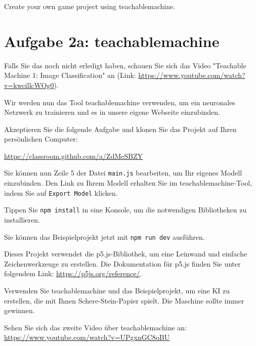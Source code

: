 \documentclass[12pt,a4paper]{report}
\begin{document}
\begin{ex}
     Create your own game project using teachablemachine.
\end{ex}

\newpage

\section*{Aufgabe 2a: teachablemachine}

\begin{ex}
    Falls Sie das noch nicht erledigt haben, schauen Sie sich das Video "Teachable Machine 1: Image Classification" an (Link: \url{https://www.youtube.com/watch?v=kwcillcWOg0}).
\end{ex}

Wir werden nun das Tool teachablemachine verwenden, um ein neuronales Netzwerk zu trainieren und es in unsere eigene Webseite einzubinden.

\begin{ex}
    Akzeptieren Sie die folgende Aufgabe und klonen Sie das Projekt auf Ihren persönlichen Computer:
    
    \url{https://classroom.github.com/a/ZdMeSBZY}

    Sie können nun Zeile 5 der Datei \verb|main.js| bearbeiten, um Ihr eigenes Modell einzubinden. Den Link zu Ihrem Modell erhalten Sie im teachablemachine-Tool, indem Sie auf \verb|Export Model| klicken.

    Tippen Sie \verb|npm install| in eine Konsole, um die notwendigen Bibliotheken zu installieren.

    Sie können das Beispielprojekt jetzt mit \verb|npm run dev| ausführen.

    Dieses Projekt verwendet die p5.js-Bibliothek, um eine Leinwand und einfache Zeichenwerkzeuge zu erstellen. Die Dokumentation für p5.js finden Sie unter folgendem Link: \url{https://p5js.org/reference/}.
\end{ex}

\begin{ex}
    Verwenden Sie teachablemachine und das Beispielprojekt, um eine KI zu erstellen, die mit Ihnen Schere-Stein-Papier spielt. Die Maschine sollte immer gewinnen.
\end{ex}

\begin{ex}
    Sehen Sie sich das zweite Video über teachablemachine an: \url{https://www.youtube.com/watch?v=UPgxnGC8oBU}
\end{ex}
\end{document}
